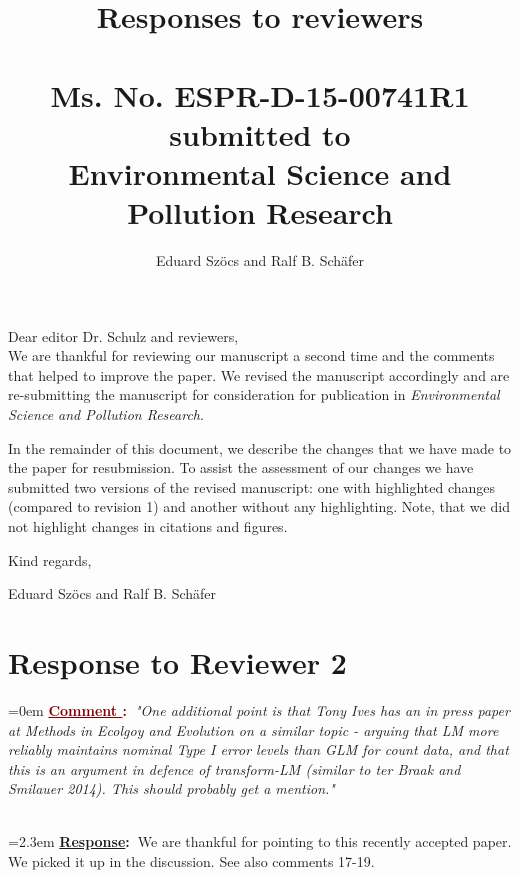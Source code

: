 \documentclass[12pt]{article}
\newcounter{cN}
\newcommand{\comment}[1]{
	\vspace{2em} 
	\refstepcounter{cN} %
	\noindent \hangindent=0em \textbf{\textcolor{Maroon}{\uline{Comment \thecN}:~}}\emph{"#1"}
	}
\newcommand{\response}[1]{
	\\[0.25em] 
	\hangindent=2.3em \textbf{\textcolor{NavyBlue}{\uline{Response}:~}}#1 
	}
\begin{document}
\title{Responses to reviewers\\~\\Ms. No. ESPR-D-15-00741R1\\submitted to\\Environmental Science and Pollution Research}

\author{Eduard Szöcs and Ralf B. Schäfer}

\maketitle
\noindent Dear editor Dr. Schulz  and reviewers,\\

We are thankful for reviewing our manuscript a second time and the comments that helped to improve the paper. 
We revised the manuscript accordingly and are re-submitting the manuscript for consideration for publication in \emph{Environmental Science and Pollution Research}. 

In the remainder of this document, we describe the changes that we have made to the paper for resubmission. 
To assist the assessment of our changes we have submitted two versions of the revised manuscript: one with highlighted changes (compared to revision 1) and another without any highlighting. 
Note, that we did not highlight changes in citations and figures.


\vspace{2em}
\hfill Kind regards,

\hfill Eduard Szöcs and Ralf B. Schäfer
\newpage








\section{Response to Reviewer 2}
\vspace{-2em}

\comment{One additional point is that Tony Ives has an in press paper at Methods in Ecolgoy and Evolution on a similar topic - arguing that LM more reliably maintains nominal Type I error levels than GLM for count data, and that this is an argument in defence of transform-LM (similar to ter Braak and Smilauer 2014). This should probably get a mention.}
\response{We are thankful for pointing to this recently accepted paper. We picked it up in the discussion. See also comments  17-19.}
\end{document}
